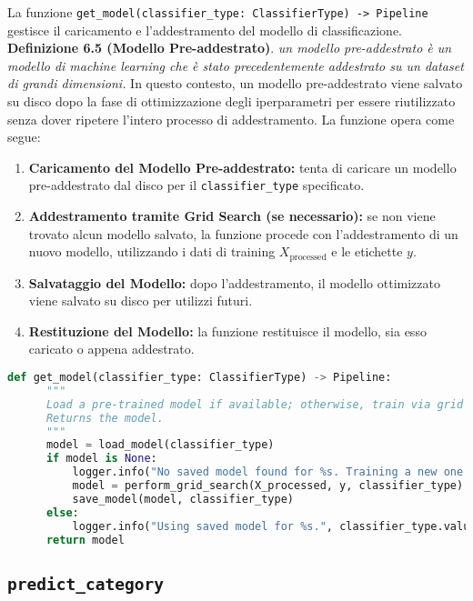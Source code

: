  La funzione \texttt{get\_model(classifier\_type: ClassifierType) -> Pipeline} gestisce il caricamento e l'addestramento del modello di classificazione.\newline
 \textbf{Definizione 6.5 (Modello Pre-addestrato)}. \textit{un modello pre-addestrato è un modello di machine learning che è stato precedentemente addestrato su un dataset di grandi dimensioni.} \newline
 In questo contesto, un modello pre-addestrato viene salvato su disco dopo la fase di ottimizzazione degli iperparametri per essere riutilizzato senza dover ripetere l'intero processo di addestramento. La funzione opera come segue:
 \begin{enumerate}
     \item \textbf{Caricamento del Modello Pre-addestrato:} tenta di caricare un modello pre-addestrato dal disco per il \texttt{classifier\_type} specificato.
     \item \textbf{Addestramento tramite Grid Search (se necessario):} se non viene trovato alcun modello salvato, la funzione procede con l'addestramento di un nuovo modello, utilizzando i dati di training \(X_{\text{processed}}\) e le etichette \(y\).
     \item \textbf{Salvataggio del Modello:} dopo l'addestramento, il modello ottimizzato viene salvato su disco per utilizzi futuri.
     \item \textbf{Restituzione del Modello:} la funzione restituisce il modello, sia esso caricato o appena addestrato.
 \end{enumerate}
\newpage
 \begin{lstlisting}[language=Python,caption={Funzione get\_model}]
  def get_model(classifier_type: ClassifierType) -> Pipeline:
      """
      Load a pre-trained model if available; otherwise, train via grid search and save the model.
      Returns the model.
      """
      model = load_model(classifier_type)
      if model is None:
          logger.info("No saved model found for %s. Training a new one...", classifier_type.value)
          model = perform_grid_search(X_processed, y, classifier_type)
          save_model(model, classifier_type)
      else:
          logger.info("Using saved model for %s.", classifier_type.value)
      return model
 \end{lstlisting}

 \subsection{\texttt{predict\_category}}


